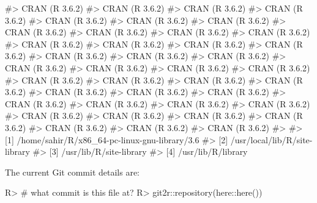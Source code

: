 \documentclass[
]{jss}
\begin{document}
\begin{CodeChunk}
\begin{CodeOutput}
#>  CRAN (R 3.6.2)                          
#>  CRAN (R 3.6.2)                          
#>  CRAN (R 3.6.2)                          
#>  CRAN (R 3.6.2)                          
#>  CRAN (R 3.6.2)                          
#>  CRAN (R 3.6.2)                          
#>  CRAN (R 3.6.2)                          
#>  CRAN (R 3.6.2)                          
#>  CRAN (R 3.6.2)                          
#>  CRAN (R 3.6.2)                          
#>  CRAN (R 3.6.2)                          
#>  CRAN (R 3.6.2)                          
#>  CRAN (R 3.6.2)                          
#>  CRAN (R 3.6.2)                          
#>  CRAN (R 3.6.2)                          
#>  CRAN (R 3.6.2)                          
#>  CRAN (R 3.6.2)                          
#>  CRAN (R 3.6.2)                          
#>  CRAN (R 3.6.2)                          
#>  CRAN (R 3.6.2)                          
#>  CRAN (R 3.6.2)                          
#>  CRAN (R 3.6.2)                          
#>  CRAN (R 3.6.2)                          
#>  CRAN (R 3.6.2)                          
#>  CRAN (R 3.6.2)                          
#>  CRAN (R 3.6.2)                          
#>  CRAN (R 3.6.2)                          
#>  CRAN (R 3.6.2)                          
#>  CRAN (R 3.6.2)                          
#>  CRAN (R 3.6.2)                          
#>  CRAN (R 3.6.2)                          
#>  CRAN (R 3.6.2)                          
#>  CRAN (R 3.6.2)                          
#>  CRAN (R 3.6.2)                          
#>  CRAN (R 3.6.2)                          
#>  CRAN (R 3.6.2)                          
#>  CRAN (R 3.6.2)                          
#>  CRAN (R 3.6.2)                          
#>  CRAN (R 3.6.2)                          
#>  CRAN (R 3.6.2)                          
#> 
#> [1] /home/sahir/R/x86_64-pc-linux-gnu-library/3.6
#> [2] /usr/local/lib/R/site-library
#> [3] /usr/lib/R/site-library
#> [4] /usr/lib/R/library
\end{CodeOutput}
\end{CodeChunk}

The current Git commit details are:

\begin{CodeChunk}

\begin{CodeInput}
R> # what commit is this file at? 
R> git2r::repository(here::here())
\end{CodeInput}

\end{CodeChunk}


\end{document}
